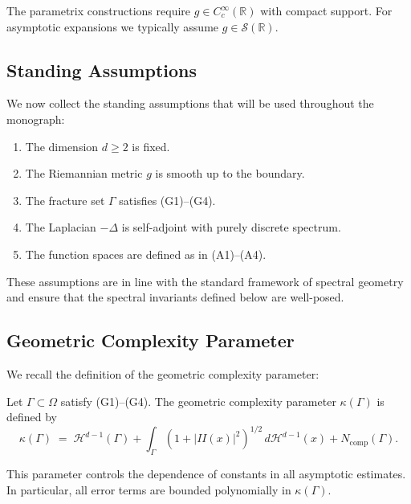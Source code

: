The parametrix constructions require $g \in C_c^\infty(\mathbb{R})$ with
compact support. For asymptotic expansions we typically assume
$g \in \mathcal{S}(\mathbb{R})$.

\subsection{Standing Assumptions}

We now collect the standing assumptions that will be used throughout the
monograph:

\begin{enumerate}[label=(S\arabic*)]
  \item The dimension $d \geq 2$ is fixed.
  \item The Riemannian metric $g$ is smooth up to the boundary.
  \item The fracture set $\Gamma$ satisfies (G1)--(G4).
  \item The Laplacian $-\Delta$ is self-adjoint with purely discrete spectrum.
  \item The function spaces are defined as in (A1)--(A4).
\end{enumerate}

These assumptions are in line with the standard framework of spectral geometry
and ensure that the spectral invariants defined below are well-posed.

\subsection{Geometric Complexity Parameter}

We recall the definition of the geometric complexity parameter:

\begin{definition}
Let $\Gamma \subset \Omega$ satisfy (G1)--(G4). The geometric complexity
parameter $\kappa(\Gamma)$ is defined by
\[
    \kappa(\Gamma) \;=\;
        \mathcal{H}^{d-1}(\Gamma)
        + \int_\Gamma (1+|II(x)|^2)^{1/2}\,d\mathcal{H}^{d-1}(x)
        + N_{\mathrm{comp}}(\Gamma).
\]
\end{definition}

This parameter controls the dependence of constants in all asymptotic
estimates. In particular, all error terms are bounded polynomially in
$\kappa(\Gamma)$.

